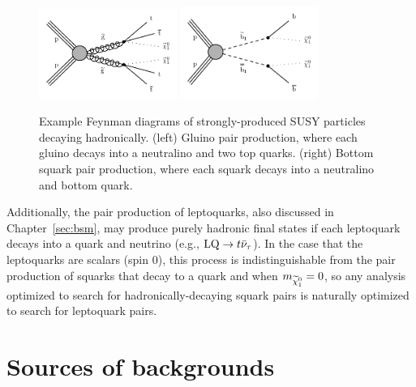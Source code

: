 \begin{figure}[t]
  \begin{center}
    \includegraphics[width=0.40\textwidth]{figs/susy_diagrams/T1tttt.pdf}
    \includegraphics[width=0.40\textwidth]{figs/susy_diagrams/T2bb.pdf}
    \caption{Example Feynman diagrams of strongly-produced SUSY particles decaying hadronically.
      (left) Gluino pair production, where each gluino decays into a neutralino and two top quarks.
      (right) Bottom squark pair production, where each squark decays into a neutralino and bottom quark.
            }
    \label{fig:example_susy_feyn}
  \end{center}
\end{figure}

Additionally, the pair production of leptoquarks, also discussed in Chapter~\ref{sec:bsm}, may produce purely hadronic final
states if each leptoquark decays into a quark and neutrino (e.g., $\mathrm{LQ}\to t\bar{\nu}_\tau$). In the case that the
leptoquarks are scalars (spin 0), this process is indistinguishable from the pair production of squarks that decay to a quark 
and \lsp when $m_{\widetilde{\chi}_1^0}=0$, so any analysis optimized to search for hadronically-decaying squark pairs is naturally optimized
to search for leptoquark pairs.


\section{Sources of backgrounds}
\label{sec:mt2_backgrounds}

